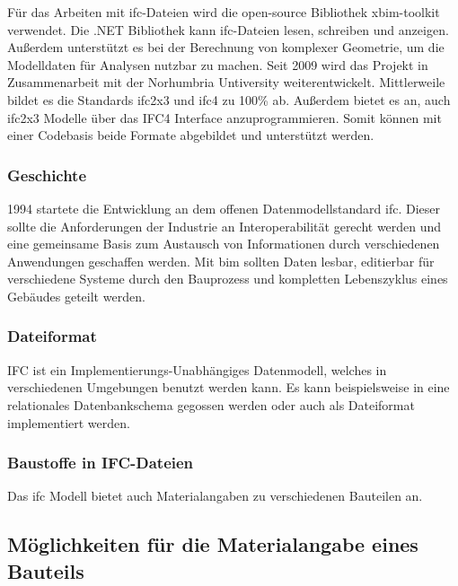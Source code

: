 Für das Arbeiten mit \ac{ifc}-Dateien wird die open-source Bibliothek xbim-toolkit verwendet. Die .NET Bibliothek kann \ac{ifc}-Dateien lesen, schreiben und anzeigen. Außerdem unterstützt es bei der Berechnung von komplexer Geometrie, um die Modelldaten für Analysen nutzbar zu machen. Seit 2009 wird das Projekt in Zusammenarbeit mit der Norhumbria Untiversity weiterentwickelt. Mittlerweile bildet es die Standards \ac{ifc2x3} und \ac{ifc4} zu 100\% ab. Außerdem bietet es an, auch \ac{ifc2x3} Modelle über das IFC4 Interface anzuprogrammieren. Somit können mit einer Codebasis beide Formate abgebildet und unterstützt werden. \citep{xbim}



\subsubsection{Geschichte}
\label{s:basics:ifc:history}
1994 startete die Entwicklung an dem offenen Datenmodellstandard \ac{ifc}. Dieser sollte die Anforderungen der Industrie an Interoperabilität gerecht werden und eine gemeinsame Basis zum Austausch von Informationen durch verschiedenen Anwendungen geschaffen werden. Mit \ac{bim} sollten Daten lesbar, editierbar für verschiedene Systeme durch den Bauprozess und kompletten Lebenszyklus eines Gebäudes geteilt werden. \citep{Laakso2012-oi}

\subsubsection{Dateiformat}
\label{s:basics:ifc:format}
IFC ist ein Implementierungs-Unabhängiges Datenmodell, welches in verschiedenen Umgebungen benutzt werden kann. Es kann beispielsweise in eine relationales Datenbankschema gegossen werden oder auch als Dateiformat implementiert werden. \citep{Laakso2012-oi}



\subsubsection{Baustoffe in IFC-Dateien}
\label{s:basics:ifc:buildingmaterial}
Das \ac{ifc} Modell bietet auch Materialangaben zu verschiedenen Bauteilen an. \citep{IFC4_doc}

\subsection{Möglichkeiten für die  Materialangabe eines Bauteils}
